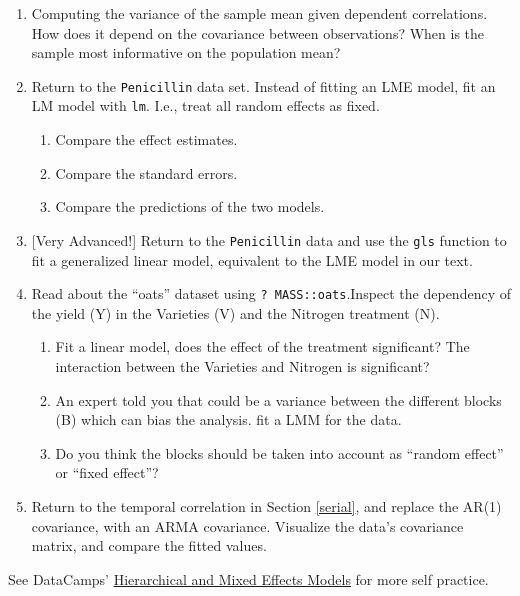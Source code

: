 \documentclass[]{book}
\providecommand{\tightlist}{%
  \setlength{\itemsep}{0pt}\setlength{\parskip}{0pt}}
\theoremstyle{definition}
\theoremstyle{definition}
\theoremstyle{definition}
\theoremstyle{remark}
\begin{document}
\begin{enumerate}
\def\labelenumi{\arabic{enumi}.}
\item
  Computing the variance of the sample mean given dependent
  correlations. How does it depend on the covariance between
  observations? When is the sample most informative on the population
  mean?
\item
  Return to the \texttt{Penicillin} data set. Instead of fitting an LME
  model, fit an LM model with \texttt{lm}. I.e., treat all random
  effects as fixed.

  \begin{enumerate}
  \def\labelenumii{\alph{enumii}.}
  \tightlist
  \item
    Compare the effect estimates.
  \item
    Compare the standard errors.
  \item
    Compare the predictions of the two models.
  \end{enumerate}
\item
  {[}Very Advanced!{]} Return to the \texttt{Penicillin} data and use
  the \texttt{gls} function to fit a generalized linear model,
  equivalent to the LME model in our text.
\item
  Read about the ``oats'' dataset using \texttt{?\ MASS::oats}.Inspect
  the dependency of the yield (Y) in the Varieties (V) and the Nitrogen
  treatment (N).

  \begin{enumerate}
  \def\labelenumii{\arabic{enumii}.}
  \tightlist
  \item
    Fit a linear model, does the effect of the treatment significant?
    The interaction between the Varieties and Nitrogen is significant?
  \item
    An expert told you that could be a variance between the different
    blocks (B) which can bias the analysis. fit a LMM for the data.
  \item
    Do you think the blocks should be taken into account as ``random
    effect'' or ``fixed effect''?
  \end{enumerate}
\item
  Return to the temporal correlation in Section \ref{serial}, and
  replace the AR(1) covariance, with an ARMA covariance. Visualize the
  data's covariance matrix, and compare the fitted values.
\end{enumerate}

See DataCamps'
\href{https://www.datacamp.com/courses/hierarchical-and-mixed-effects-models}{Hierarchical
and Mixed Effects Models} for more self practice.
\end{document}
